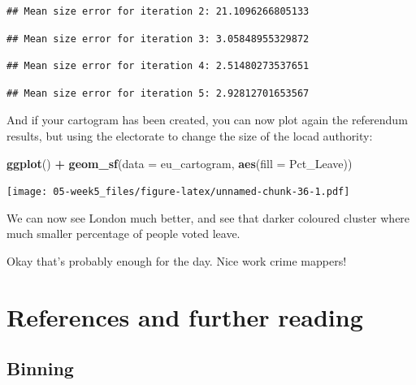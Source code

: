 \documentclass[]{book}
\newenvironment{Shaded}{\begin{snugshade}}{\end{snugshade}}
\newcommand{\DataTypeTok}[1]{\textcolor[rgb]{0.13,0.29,0.53}{#1}}
\newcommand{\KeywordTok}[1]{\textcolor[rgb]{0.13,0.29,0.53}{\textbf{#1}}}
\newcommand{\NormalTok}[1]{#1}
\newcommand{\OperatorTok}[1]{\textcolor[rgb]{0.81,0.36,0.00}{\textbf{#1}}}
\newcommand{\StringTok}[1]{\textcolor[rgb]{0.31,0.60,0.02}{#1}}
\begin{document}
\begin{verbatim}
## Mean size error for iteration 2: 21.1096266805133
\end{verbatim}

\begin{verbatim}
## Mean size error for iteration 3: 3.05848955329872
\end{verbatim}

\begin{verbatim}
## Mean size error for iteration 4: 2.51480273537651
\end{verbatim}

\begin{verbatim}
## Mean size error for iteration 5: 2.92812701653567
\end{verbatim}

And if your cartogram has been created, you can now plot again the referendum results, but using the electorate to change the size of the locad authority:

\begin{Shaded}
\begin{Highlighting}[]
\KeywordTok{ggplot}\NormalTok{() }\OperatorTok{+}
\StringTok{  }\KeywordTok{geom_sf}\NormalTok{(}\DataTypeTok{data =}\NormalTok{ eu_cartogram, }\KeywordTok{aes}\NormalTok{(}\DataTypeTok{fill =}\NormalTok{ Pct_Leave)) }
\end{Highlighting}
\end{Shaded}

\texttt{[image: 05-week5\_files/figure-latex/unnamed-chunk-36-1.pdf]}

We can now see London much better, and see that darker coloured cluster where much smaller percentage of people voted leave.

Okay that's probably enough for the day. Nice work crime mappers!

\hypertarget{references-and-further-reading}{%
\section{References and further reading}\label{references-and-further-reading}}

\hypertarget{binning}{%
\subsection{Binning}\label{binning}}
\end{document}
